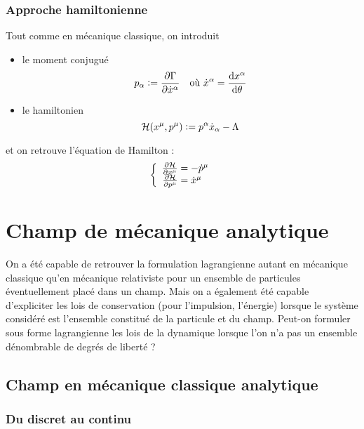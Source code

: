 \subsubsection{Approche hamiltonienne}
Tout comme en mécanique classique, on introduit 
\begin{itemize}
	\item le moment conjugué
	$$
		p_{\alpha}\vcentcolon=\frac{\partial\Gamma}{\partial\dot{x}^{\alpha}}\text{\hspace{10pt}où 	}\dot{x}^{\alpha}=\frac{\mathrm{d} x^{\alpha}}{\mathrm{d}\theta}
	$$
	\item le hamiltonien
	$$
		\mathcal{H}(x^\mu,p^\mu)\vcentcolon= p^{\alpha}\dot{x}_{\alpha}-\Lambda
	$$
\end{itemize}
et on retrouve l'équation de Hamilton :
$$
	\left\{ \begin{array}{r@{\;}l}
		\frac{\partial\mathcal{H}}{\partial x^\mu}&=-\dot{p}^\mu\\
		\frac{\partial\mathcal{H}}{\partial p^\mu}&=\dot{x}^\mu\\
	\end{array} \right.
$$


\section{Champ de mécanique analytique}
On a été capable de retrouver la formulation lagrangienne autant en mécanique classique qu'en mécanique relativiste pour un ensemble de particules éventuellement placé dans un champ. Mais on a également été capable d'expliciter les lois de conservation (pour l'impulsion, l'énergie) lorsque le système considéré est l'ensemble constitué de la particule et du champ. Peut-on formuler sous forme lagrangienne les lois de la dynamique lorsque l'on n'a pas un ensemble dénombrable de degrés de liberté ?

\subsection{Champ en mécanique classique analytique}
\subsubsection{Du discret au continu}

